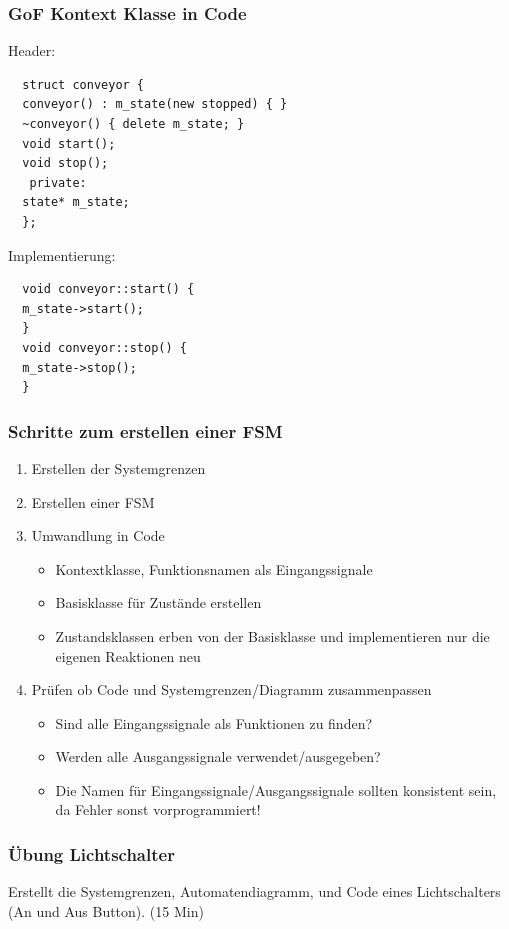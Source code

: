 \documentclass{beamer}
\begin{document}
\begin{frame}[fragile]
 \frametitle{GoF Kontext Klasse in Code}
 Header:
 \begin{lstlisting}
  struct conveyor {
  conveyor() : m_state(new stopped) { }
  ~conveyor() { delete m_state; }
  void start();
  void stop();
   private:
  state* m_state;
  };
 \end{lstlisting}
 Implementierung:
 \begin{lstlisting}
  void conveyor::start() {
  m_state->start();
  }
  void conveyor::stop() {
  m_state->stop();
  }
 \end{lstlisting}
\end{frame}

\begin{frame}
 \frametitle{Schritte zum erstellen einer FSM}
 \begin{enumerate}
  \item Erstellen der Systemgrenzen
  \item Erstellen einer FSM
  \item Umwandlung in Code
  \begin{itemize}
   \item Kontextklasse, Funktionsnamen als Eingangssignale
   \item Basisklasse f\"ur Zust\"ande erstellen
   \item Zustandsklassen erben von der Basisklasse und implementieren nur die eigenen Reaktionen neu
  \end{itemize}
  \item Pr\"ufen ob Code und Systemgrenzen/Diagramm zusammenpassen
  \begin{itemize}
   \item Sind alle Eingangssignale als Funktionen zu finden?
   \item Werden alle Ausgangssignale verwendet/ausgegeben?
   \item Die Namen f\"ur Eingangssignale/Ausgangssignale sollten konsistent sein, da Fehler sonst vorprogrammiert!
  \end{itemize}
 \end{enumerate}
\end{frame}

\begin{frame}
 \frametitle{\"Ubung Lichtschalter}
 Erstellt die Systemgrenzen, Automatendiagramm, und Code eines Lichtschalters (An und Aus Button). (15 Min)
\end{frame}
\end{document}
